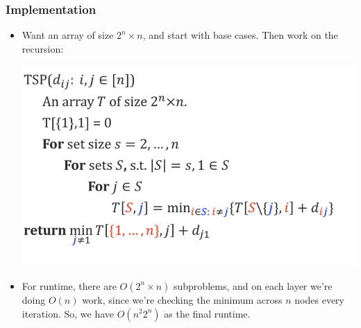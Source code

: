 \subsubsection{Implementation}
\begin{itemize}
	\item Want an array of size $2^n \times n$, and start with base cases. Then work on the recursion:
		\begin{center}
			\includegraphics[scale=0.5]{TSP-code.png}
		\end{center}
	\item For runtime, there are $O(2^n \times n)$ subproblems, and on each layer we're doing $O(n)$ work, since
		we're checking the minimum across $n$ nodes every iteration. So, we have $O(n^2 2^n)$ as 
		the final runtime. 


\end{itemize}
